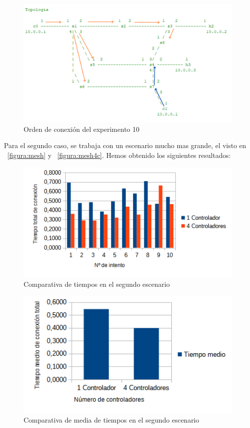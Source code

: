 \documentclass[a4paper, 12pt]{book}
\begin{document}
		\begin{figure}
		\centering
		\includegraphics[width=16cm, keepaspectratio]{img/escenario1_2c_8}
		\caption{Orden de conexión del experimento 10}
		\label{figura:escenario1_2c_8}
	\end{figure}

	
	Para el segundo caso, se trabaja con un escenario mucho mas grande, el visto en ~\ref{figura:mesh} y ~\ref{figura:mesh4c}. Hemos obtenido los siguientes resultados:
	
	\begin{figure}
		\centering
		\includegraphics[width=16cm, keepaspectratio]{img/comparativamesh}
		\caption{Comparativa de tiempos en el segundo escenario}
		\label{figura:comparativamesh}
	\end{figure}
	
	\begin{figure}
		\centering
		\includegraphics[width=16cm, keepaspectratio]{img/comparativamediamesh}
		\caption{Comparativa de media de tiempos en el segundo escenario}
		\label{figura:mediamesh}
	\end{figure}
	
\end{document}
